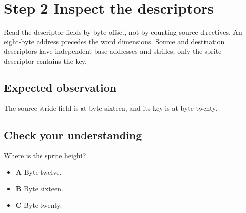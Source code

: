 \section{Step 2 Inspect the descriptors}\label{blit-s02}

Read the descriptor fields by byte offset, not by counting source directives. An eight-byte address precedes the word dimensions. Source and destination descriptors have independent base addresses and strides; only the sprite descriptor contains the key.


\subsection{Expected observation}
The source stride field is at byte sixteen, and its key is at byte twenty.

\subsection{Check your understanding}
Where is the sprite height?

\begin{itemize}
  \item \textbf{A} Byte twelve.
  \item \textbf{B} Byte sixteen.
  \item \textbf{C} Byte twenty.
\end{itemize}
